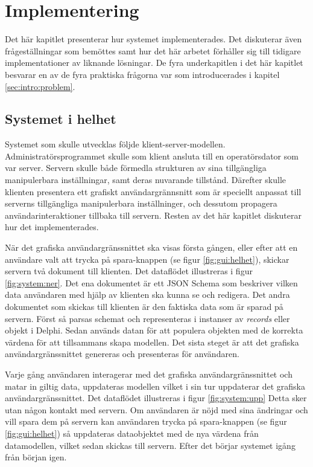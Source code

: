 \chapter{Implementering}
\label{sec:arbetet}
Det här kapitlet presenterar hur systemet implementerades. Det diskuterar även frågeställningar som bemöttes samt hur det här arbetet förhåller sig till tidigare implementationer av liknande lösningar. De fyra underkapitlen i det här kapitlet besvarar en av de fyra praktiska frågorna var som introducerades i kapitel \ref{sec:intro:problem}.

\section{Systemet i helhet}

Systemet som skulle utvecklas följde klient-server-modellen. Administratörsprogrammet skulle som klient ansluta till en operatörsdator som var server. Servern skulle både förmedla strukturen av sina tillgängliga manipulerbara inställningar, samt deras nuvarande tillstånd. Därefter skulle klienten presentera ett grafiskt användargrännsnitt som är speciellt anpassat till serverns tillgängliga manipulerbara inställninger, och dessutom propagera användarinteraktioner tillbaka till servern. Resten av det här kapitlet diskuterar hur det implementerades.

När det grafiska användargränssnittet ska visas första gången, eller efter att en användare valt att trycka på spara-knappen (se figur \ref{fig:gui:helhet}), skickar servern två dokument till klienten. Det dataflödet illustreras i figur \ref{fig:system:ner}. Det ena dokumentet är ett JSON Schema som beskriver vilken data användaren med hjälp av klienten ska kunna se och redigera. Det andra dokumentet som skickas till klienten är den faktiska data som är sparad på servern. Först så parsas schemat och representeras i instanser av \textit{records} eller objekt i Delphi. Sedan används datan för att populera objekten med de korrekta värdena för att tillsammans skapa modellen. Det sista steget är att det grafiska användargränssnittet genereras och presenteras för användaren.

Varje gång användaren interagerar med det grafiska användargränssnittet och matar in giltig data, uppdateras modellen vilket i sin tur uppdaterar det grafiska användargränssnittet. Det dataflödet illustreras i figur \ref{fig:system:upp} Detta sker utan någon kontakt med servern. Om användaren är nöjd med sina ändringar och vill spara dem på servern kan användaren trycka på spara-knappen (se figur \ref{fig:gui:helhet}) så uppdateras dataobjektet med de nya värdena från datamodellen, vilket sedan skickas till servern. Efter det börjar systemet igång från början igen.

